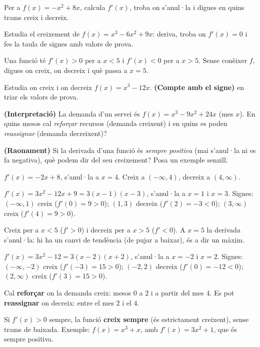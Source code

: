 \begin{exercicis}
\begin{exlist}
  \item Per a $f(x)=-x^2+8x$, calcula $f'(x)$, troba on s'anul·la i digues en quins
        trams creix i decreix.
  \item Estudia el creixement de $f(x)=x^3-6x^2+9x$: deriva, troba on $f'(x)=0$ i fes la
        taula de signes amb valors de prova.
  \item Una funció té $f'(x)>0$ per a $x<5$ i $f'(x)<0$ per a $x>5$. Sense conèixer
        $f$, digues on creix, on decreix i què passa a $x=5$.
  \item Estudia on creix i on decreix $f(x)=x^3-12x$.
        \textbf{(Compte amb el signe)} en triar els valors de prova.
  \item \textbf{(Interpretació)} La demanda d'un servei és $f(x)=x^3-9x^2+24x$ (mes
        $x$). En quins mesos cal \emph{reforçar} recursos (demanda creixent) i en quins
        es poden \emph{reassignar} (demanda decreixent)?
  \item \textbf{(Raonament)} Si la derivada d'una funció és \emph{sempre positiva}
        (mai s'anul·la ni es fa negativa), què podem dir del seu creixement? Posa un
        exemple senzill.
\end{exlist}
\end{exercicis}

\begin{solucions}
\begin{sollist}
  \item $f'(x)=-2x+8$, s'anul·la a $x=4$. Creix a $(-\infty,4)$, decreix a
        $(4,\infty)$.
  \item $f'(x)=3x^2-12x+9=3(x-1)(x-3)$, s'anul·la a $x=1$ i $x=3$. Signes: $(-\infty,1)$
        creix ($f'(0)=9>0$); $(1,3)$ decreix ($f'(2)=-3<0$); $(3,\infty)$ creix
        ($f'(4)=9>0$).
  \item Creix per a $x<5$ ($f'>0$) i decreix per a $x>5$ ($f'<0$). A $x=5$ la derivada
        s'anul·la: hi ha un canvi de tendència (de pujar a baixar), és a dir un màxim.
  \item $f'(x)=3x^2-12=3(x-2)(x+2)$, s'anul·la a $x=-2$ i $x=2$. Signes: $(-\infty,-2)$
        creix ($f'(-3)=15>0$); $(-2,2)$ decreix ($f'(0)=-12<0$); $(2,\infty)$ creix
        ($f'(3)=15>0$).
  \item Cal \textbf{reforçar} on la demanda creix: mesos $0$ a $2$ i a partir del mes
        $4$. Es pot \textbf{reassignar} on decreix: entre el mes $2$ i el $4$.
  \item Si $f'(x)>0$ sempre, la funció \textbf{creix sempre} (és estrictament
        creixent), sense trams de baixada. Exemple: $f(x)=x^3+x$, amb
        $f'(x)=3x^2+1$, que és sempre positiva.
\end{sollist}
\end{solucions}
